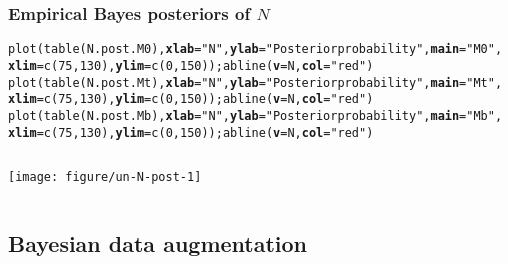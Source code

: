 \documentclass[color=usenames,dvipsnames]{beamer}\usepackage[]{graphicx}\usepackage[]{color}
\makeatletter
\newcommand{\hlnum}[1]{\textcolor[rgb]{0.69,0.494,0}{#1}}%
\newcommand{\hlstr}[1]{\textcolor[rgb]{0.749,0.012,0.012}{#1}}%
\newcommand{\hlstd}[1]{\textcolor[rgb]{0,0,0}{#1}}%
\newcommand{\hlkwc}[1]{\textcolor[rgb]{0,0,0}{\textbf{#1}}}%
\newcommand{\hlkwd}[1]{\textcolor[rgb]{0.004,0.004,0.506}{#1}}%
\newenvironment{kframe}{%
 \def\at@end@of@kframe{}%
 \ifinner\ifhmode%
  \def\at@end@of@kframe{\end{minipage}}%
  \begin{minipage}{\columnwidth}%
 \fi\fi%
 \def\FrameCommand##1{\hskip\@totalleftmargin \hskip-\fboxsep
 \colorbox{shadecolor}{##1}\hskip-\fboxsep
     \hskip-\linewidth \hskip-\@totalleftmargin \hskip\columnwidth}%
 \MakeFramed {\advance\hsize-\width
   \@totalleftmargin\z@ \linewidth\hsize
   \@setminipage}}%
 {\par\unskip\endMakeFramed%
 \at@end@of@kframe}
\newenvironment{knitrout}{}{} %
\makeatother
\begin{document}
\begin{frame}[fragile]
  \frametitle{Empirical Bayes posteriors of $N$}
\begin{knitrout}\tiny
{}\color{fgcolor}\begin{kframe}
\begin{alltt}
\hlkwd{plot}\hlstd{(}\hlkwd{table}\hlstd{(N.post.M0),} \hlkwc{xlab}\hlstd{=}\hlstr{"N"}\hlstd{,} \hlkwc{ylab}\hlstd{=}\hlstr{"Posterior probability"}\hlstd{,} \hlkwc{main}\hlstd{=}\hlstr{"M0"}\hlstd{,}
     \hlkwc{xlim}\hlstd{=}\hlkwd{c}\hlstd{(}\hlnum{75}\hlstd{,} \hlnum{130}\hlstd{),} \hlkwc{ylim}\hlstd{=}\hlkwd{c}\hlstd{(}\hlnum{0}\hlstd{,}\hlnum{150}\hlstd{));} \hlkwd{abline}\hlstd{(}\hlkwc{v}\hlstd{=N,} \hlkwc{col}\hlstd{=}\hlstr{"red"}\hlstd{)}
\hlkwd{plot}\hlstd{(}\hlkwd{table}\hlstd{(N.post.Mt),} \hlkwc{xlab}\hlstd{=}\hlstr{"N"}\hlstd{,} \hlkwc{ylab}\hlstd{=}\hlstr{"Posterior probability"}\hlstd{,} \hlkwc{main}\hlstd{=}\hlstr{"Mt"}\hlstd{,}
     \hlkwc{xlim}\hlstd{=}\hlkwd{c}\hlstd{(}\hlnum{75}\hlstd{,} \hlnum{130}\hlstd{),} \hlkwc{ylim}\hlstd{=}\hlkwd{c}\hlstd{(}\hlnum{0}\hlstd{,}\hlnum{150}\hlstd{));} \hlkwd{abline}\hlstd{(}\hlkwc{v}\hlstd{=N,} \hlkwc{col}\hlstd{=}\hlstr{"red"}\hlstd{)}
\hlkwd{plot}\hlstd{(}\hlkwd{table}\hlstd{(N.post.Mb),} \hlkwc{xlab}\hlstd{=}\hlstr{"N"}\hlstd{,} \hlkwc{ylab}\hlstd{=}\hlstr{"Posterior probability"}\hlstd{,} \hlkwc{main}\hlstd{=}\hlstr{"Mb"}\hlstd{,}
     \hlkwc{xlim}\hlstd{=}\hlkwd{c}\hlstd{(}\hlnum{75}\hlstd{,} \hlnum{130}\hlstd{),} \hlkwc{ylim}\hlstd{=}\hlkwd{c}\hlstd{(}\hlnum{0}\hlstd{,}\hlnum{150}\hlstd{));} \hlkwd{abline}\hlstd{(}\hlkwc{v}\hlstd{=N,} \hlkwc{col}\hlstd{=}\hlstr{"red"}\hlstd{)}
\end{alltt}
\end{kframe}
\end{knitrout}
  \begin{columns}
    \begin{column}{\paperwidth}
      \texttt{[image: figure/un-N-post-1]}
    \end{column}
  \end{columns}
\end{frame}





\subsection{Bayesian data augmentation}
\end{document}
